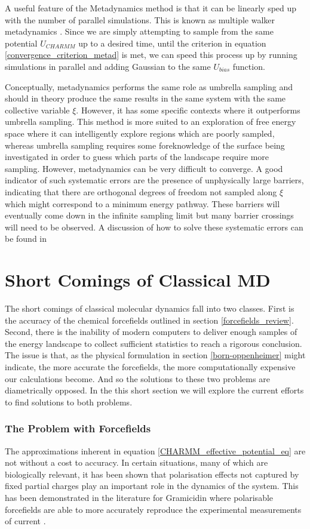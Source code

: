A useful feature of the Metadynamics method is that it can be linearly sped up with the number of parallel simulations. This is known as multiple walker metadynamics \cite{raiteri2006}. Since we are simply attempting to sample from the same potential $U_{CHARMM}$ up to a desired time, until the criterion in equation \ref{convergence_criterion_metad} is met, we can speed this process up by running simulations in parallel and adding Gaussian to the same $U_{bias}$ function.

Conceptually, metadynamics performs the same role as umbrella sampling and should in theory produce the same results in the same system with the same collective variable $\xi$. However, it has some specific contexts where it outperforms umbrella sampling. This method is more suited to an exploration of free energy space where it can intelligently explore regions which are poorly sampled, whereas umbrella sampling requires some foreknowledge of the surface being investigated in order to guess which parts of the landscape require more sampling. However, metadynamics can be very difficult to converge. A good indicator of such systematic errors are the presence of unphysically large barriers, indicating that there are orthogonal degrees of freedom not sampled along $\xi$ which might correspond to a minimum energy pathway. These barriers will eventually come down in the infinite sampling limit but many barrier crossings will need to be observed. A discussion of how to solve these systematic errors can be found in \cite{bussi2020a} 

\section{Short Comings of Classical MD}
The short comings of classical molecular dynamics fall into two classes. First is the accuracy of the chemical forcefields outlined in section \ref{forcefields_review}. Second, there is the inability of modern computers to deliver enough samples of the energy landscape to collect sufficient statistics to reach a rigorous conclusion. The issue is that, as the physical formulation in section \ref{born-oppenheimer} might indicate, the more accurate the forcefields, the more computationally expensive our calculations become. And so the solutions to these two problems are diametrically opposed. In the this short section we will explore the current efforts to find solutions to both problems.

\subsubsection{The Problem with Forcefields}
The approximations inherent in equation \ref{CHARMM_effective_potential_eq} are not without a cost to accuracy. In certain situations, many of which are biologically relevant, it has been shown that polarisation effects not captured by fixed partial charges play an important role in the dynamics of the system. This has been demonstrated in the literature for Gramicidin where polarisable forcefields are able to more accurately reproduce the experimental measurements of current \cite{ngo2021}.

